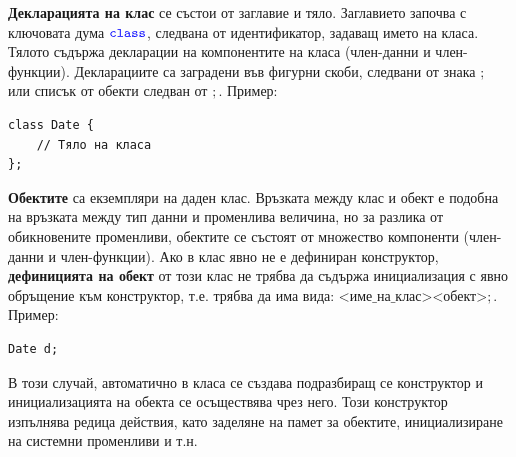 \documentclass{article}
\begin{document}
\textbf{Декларацията на клас} се състои от заглавие и тяло. Заглавието започва с ключовата дума $\textcolor{blue}{\texttt{class}}$, следвана от идентификатор,
задаващ името на класа. Тялото съдържа декларации на компонентите на класа (член-данни и член-функции). Декларациите са заградени
във фигурни скоби, следвани от знака $;$ или списък от обекти следван от $;$. \newline\newline
Пример: \begin{lstlisting}[style=cpp]
class Date {
    // Тяло на класа
};
\end{lstlisting}
\textbf{Обектите} са екземпляри на даден клас. Връзката между клас и обект е подобна на връзката между тип данни и променлива
величина, но за разлика от обикновените променливи, обектите се състоят от множество компоненти (член-данни и член-функции).
Ако в клас явно не е дефиниран конструктор, \textbf{дефиницията на обект} от този клас не трябва да съдържа инициализация с явно
обръщение към конструктор, т.е. трябва да има вида: $\text{<име\_на\_клас><обект>};$. \newline\newline
Пример: \begin{lstlisting}[style=cpp]
Date d;
\end{lstlisting}
В този случай, автоматично в класа се създава подразбиращ се конструктор и инициализацията на обекта се осъществява чрез него.
Този конструктор изпълнява редица действия, като заделяне на памет за обектите, инициализиране на системни променливи и т.н.
\end{document}
